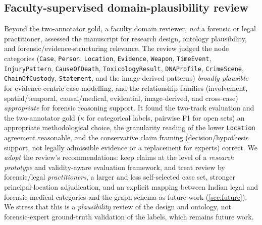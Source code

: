 \documentclass[conference]{IEEEtran}
\newcommand{\node}[1]{\texttt{#1}}
\begin{document}
\subsection{Faculty-supervised domain-plausibility review}
\label{sec:facultyreview}
Beyond the two-annotator gold, a faculty domain reviewer, \emph{not} a forensic or
legal practitioner, assessed the manuscript for research design, ontology
plausibility, and forensic/evidence-structuring relevance. The review judged the
node categories (\node{Case}, \node{Person}, \node{Location}, \node{Evidence},
\node{Weapon}, \node{TimeEvent}, \node{InjuryPattern}, \node{CauseOfDeath},
\node{ToxicologyResult}, \node{DNAProfile}, \node{CrimeScene},
\node{ChainOfCustody}, \node{Statement}, and the image-derived patterns)
\emph{broadly plausible} for evidence-centric case modelling, and the relationship
families (involvement, spatial/temporal, causal/medical, evidential, image-derived,
and cross-case) \emph{appropriate} for forensic reasoning support. It found the
two-track evaluation and the two-annotator gold ($\kappa$ for categorical labels,
pairwise F1 for open sets) an appropriate methodological choice, the
granularity reading of the lower \node{Location} agreement reasonable, and the
conservative claim framing (decision/hypothesis support, not legally admissible
evidence or a replacement for experts) correct. We \emph{adopt} the review's
recommendations: keep claims at the level of a \emph{research prototype} and
validity-aware evaluation framework, and treat review by forensic/legal
\emph{practitioners}, a larger and less self-selected case set, stronger
principal-location adjudication, and an explicit mapping between Indian legal and
forensic-medical categories and the graph schema as future work
(\cref{sec:future}). We stress that this is a \emph{plausibility} review of the
design and ontology, not forensic-expert ground-truth validation of the labels,
which remains future work.
\end{document}
